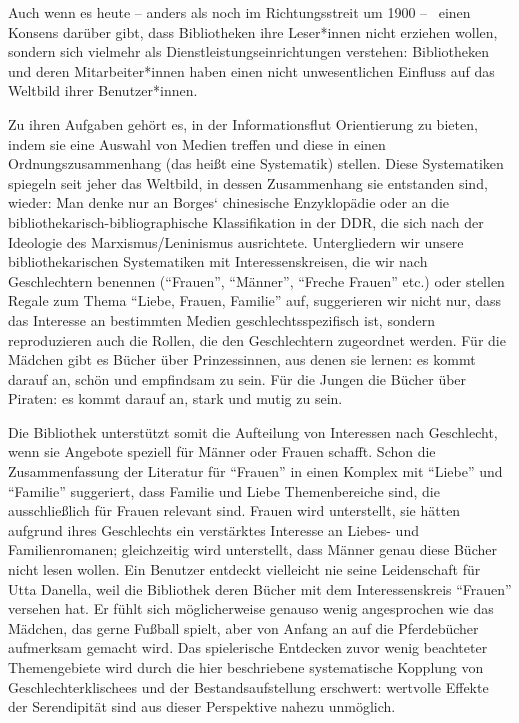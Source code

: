 \documentclass[a4paper,
fontsize=11pt,
oneside,
numbers=noperiodatend,
parskip=half-,
bibliography=totoc,
final
]{scrartcl}
\begin{document}
Auch wenn es heute -- anders als noch im Richtungsstreit um 1900 --~
einen Konsens darüber gibt, dass Bibliotheken ihre Leser*innen nicht
erziehen wollen, sondern sich vielmehr als Dienstleistungseinrichtungen
verstehen: Bibliotheken und deren Mitarbeiter*innen haben einen nicht
unwesentlichen Einfluss auf das Weltbild ihrer Benutzer*innen.

Zu ihren Aufgaben gehört es, in der Informationsflut Orientierung zu
bieten, indem sie eine Auswahl von Medien treffen und diese in einen
Ordnungszusammenhang (das heißt eine Systematik) stellen. Diese
Systematiken spiegeln seit jeher das Weltbild, in dessen Zusammenhang
sie entstanden sind, wieder: Man denke nur an Borges` chinesische
Enzyklopädie oder an die bibliothekarisch-bibliographische
Klassifikation in der DDR, die sich nach der Ideologie des
Marxismus/Leninismus ausrichtete. Untergliedern wir unsere
bibliothekarischen Systematiken mit Interessenskreisen, die wir nach
Geschlechtern benennen (\enquote{Frauen}, \enquote{Männer},
\enquote{Freche Frauen} etc.) oder stellen Regale zum Thema
\enquote{Liebe, Frauen, Familie} auf, suggerieren wir nicht nur, dass
das Interesse an bestimmten Medien geschlechtsspezifisch ist, sondern
reproduzieren auch die Rollen, die den Geschlechtern zugeordnet werden.
Für die Mädchen gibt es Bücher über Prinzessinnen, aus denen sie lernen:
es kommt darauf an, schön und empfindsam zu sein. Für die Jungen die
Bücher über Piraten: es kommt darauf an, stark und mutig zu sein.

Die Bibliothek unterstützt somit die Aufteilung von Interessen nach
Geschlecht, wenn sie Angebote speziell für Männer oder Frauen schafft.
Schon die Zusammenfassung der Literatur für \enquote{Frauen} in einen
Komplex mit \enquote{Liebe} und \enquote{Familie} suggeriert, dass
Familie und Liebe Themenbereiche sind, die ausschließlich für Frauen
relevant sind. Frauen wird unterstellt, sie hätten aufgrund ihres
Geschlechts ein verstärktes Interesse an Liebes- und Familienromanen;
gleichzeitig wird unterstellt, dass Männer genau diese Bücher nicht
lesen wollen. Ein Benutzer entdeckt vielleicht nie seine Leidenschaft
für Utta Danella, weil die Bibliothek deren Bücher mit dem
Interessenskreis \enquote{Frauen} versehen hat. Er fühlt sich
möglicherweise genauso wenig angesprochen wie das Mädchen, das gerne
Fußball spielt, aber von Anfang an auf die Pferdebücher aufmerksam
gemacht wird. Das spielerische Entdecken zuvor wenig beachteter
Themengebiete wird durch die hier beschriebene systematische Kopplung
von Geschlechterklischees und der Bestandsaufstellung erschwert:
wertvolle Effekte der Serendipität sind aus dieser Perspektive nahezu
unmöglich.
\end{document}
